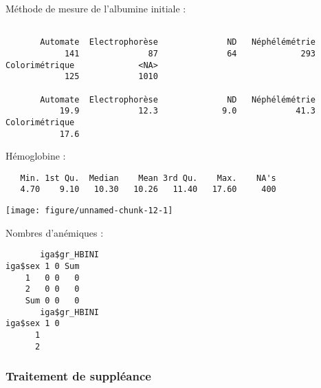 \documentclass[11pt,a4paper]{article}\usepackage[]{graphicx}\usepackage[]{color}
\makeatletter
\def\maxwidth{ %
  \ifdim\Gin@nat@width>\linewidth
    \linewidth
  \else
    \Gin@nat@width
  \fi
}
\newenvironment{kframe}{%
 \def\at@end@of@kframe{}%
 \ifinner\ifhmode%
  \def\at@end@of@kframe{\end{minipage}}%
  \begin{minipage}{\columnwidth}%
 \fi\fi%
 \def\FrameCommand##1{\hskip\@totalleftmargin \hskip-\fboxsep
 \colorbox{shadecolor}{##1}\hskip-\fboxsep
     \hskip-\linewidth \hskip-\@totalleftmargin \hskip\columnwidth}%
 \MakeFramed {\advance\hsize-\width
   \@totalleftmargin\z@ \linewidth\hsize
   \@setminipage}}%
 {\par\unskip\endMakeFramed%
 \at@end@of@kframe}
\newenvironment{knitrout}{}{} %
\makeatother
\begin{document}
Méthode de mesure de l'albumine initiale :

\begin{knitrout}
\color{fgcolor}\begin{kframe}
\begin{verbatim}

       Automate  Electrophorèse              ND   Néphélémétrie 
            141              87              64             293 
Colorimétrique             <NA> 
            125            1010 

       Automate  Electrophorèse              ND   Néphélémétrie 
           19.9            12.3             9.0            41.3 
Colorimétrique  
           17.6 
\end{verbatim}
\end{kframe}
\end{knitrout}

Hémoglobine :

\begin{knitrout}
\color{fgcolor}\begin{kframe}
\begin{verbatim}
   Min. 1st Qu.  Median    Mean 3rd Qu.    Max.    NA's 
   4.70    9.10   10.30   10.26   11.40   17.60     400 
\end{verbatim}
\end{kframe}
\texttt{[image: figure/unnamed-chunk-12-1]} 

\end{knitrout}

Nombres d'anémiques :

\begin{knitrout}
\color{fgcolor}\begin{kframe}
\begin{verbatim}
       iga$gr_HBINI
iga$sex 1 0 Sum
    1   0 0   0
    2   0 0   0
    Sum 0 0   0
       iga$gr_HBINI
iga$sex 1 0
      1    
      2    
\end{verbatim}


{\ttfamily\noindent\bfseries\color{errorcolor}{Error in chisq.test(table(iga\$sex, iga\$gr\_HBINI), correct = F): at least one entry of 'x' must be positive}}\end{kframe}
\end{knitrout}


    \subsubsection{Traitement de suppléance}
\end{document}
